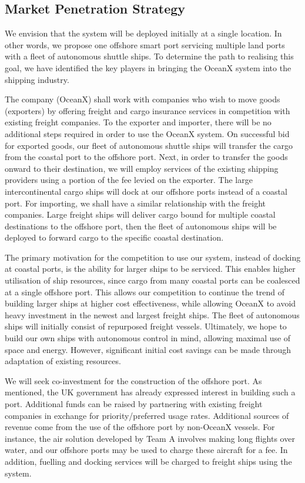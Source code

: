 \subsection{Market Penetration Strategy}

We envision that the system will be  deployed initially at a single location. In other words, we propose one offshore smart port servicing multiple land ports with a fleet of autonomous shuttle ships. To determine the path to realising this goal, we have identified the key players in bringing the OceanX system into the shipping industry. 

The company (OceanX) shall work with companies who wish to move goods (exporters) by offering freight and cargo insurance services in competition with existing freight companies. To the exporter and importer, there will be no additional steps required in order to use the OceanX system. On successful bid for exported goods, our fleet of autonomous shuttle ships will transfer the cargo from the coastal port to the offshore port. Next, in order to transfer the goods onward to their destination, we will employ services of the existing shipping providers  using a portion of the fee levied on the exporter. The large intercontinental cargo ships will dock at our offshore ports instead of a coastal port. For importing, we shall have a similar relationship with the freight companies. Large freight ships will deliver cargo bound for multiple coastal destinations to the offshore port, then the fleet of autonomous ships will be deployed to forward cargo to the specific coastal destination.

The primary motivation for the competition to use our system, instead of docking at coastal ports, is the ability for larger ships to be serviced. This enables higher utilisation of ship resources, since cargo from many coastal ports can be coalesced at a single offshore port. This allows our competition to continue the trend of building larger ships at higher cost effectiveness, while allowing OceanX to avoid heavy investment in the newest and largest freight ships. The fleet of autonomous ships will initially consist of repurposed freight vessels.  Ultimately, we hope to build our own ships with autonomous control in mind, allowing maximal use of space and energy. However, significant initial cost savings can be made through adaptation of existing resources. 

We will seek co-investment for the construction of the offshore port. As mentioned, the UK government has already expressed interest in building such a port. Additional funds can be raised by partnering with existing freight companies in exchange for priority/preferred usage rates. Additional sources of revenue come from the use of the offshore port by non-OceanX vessels. For instance, the air solution developed by Team A involves making long flights over water, and our offshore ports may be used to charge these aircraft for a fee. In addition, fuelling and docking services will be charged to freight ships using the system.

